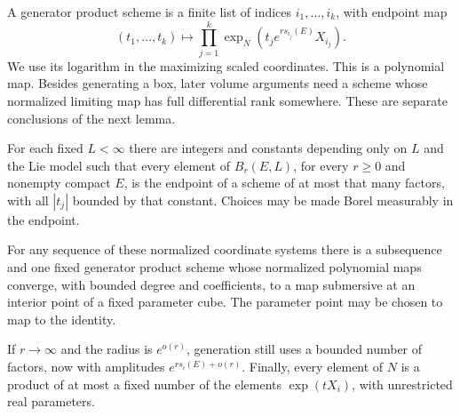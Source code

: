 A generator product scheme is a finite list of indices
$i_1,\ldots,i_k$, with endpoint map
\begin{equation}\label{eq:generator-endpoint-map}
 (t_1,\ldots,t_k)\longmapsto
 \prod_{j=1}^k\exp_N(t_je^{rs_{i_j}(E)}X_{i_j}).
\end{equation}
We use its logarithm in the maximizing scaled coordinates. This is
a polynomial map. Besides generating a box, later volume arguments
need a scheme whose normalized limiting map has full differential
rank somewhere. These are separate conclusions of the next lemma.

\begin{lemma}\label{lem:product-schemes}
For each fixed $L<\infty$ there are integers and constants depending
only on $L$ and the Lie model such that every element of $B_r(E,L)$,
for every $r\ge0$ and nonempty compact $E$, is the endpoint of a
scheme of at most that many factors, with all $|t_j|$ bounded by
that constant. Choices may be made Borel measurably in the endpoint.

For any sequence of these normalized coordinate systems there is a
subsequence and one fixed generator product scheme whose normalized
polynomial maps converge, with bounded degree and coefficients, to a
map submersive at an interior point of a fixed parameter cube. The
parameter point may be chosen to map to the identity.

If $r\to\infty$ and the radius is $e^{o(r)}$, generation still uses a
bounded number of factors, now with amplitudes
$e^{rs_i(E)+o(r)}$. Finally, every element of $N$ is a product of at
most a fixed number of the elements $\exp(tX_i)$, with unrestricted
real parameters.
\end{lemma}

